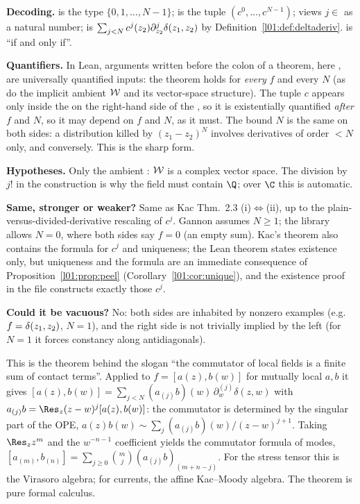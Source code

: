 \begin{dictionary}
\textbf{Decoding.}  is the type $\{0,1,\dots,N-1\}$;  is the tuple
$(c^0,\dots,c^{N-1})$;  views $j\in$  as a natural number;
 is $\sum_{j<N}c^j(z_2)\partial^j_{z_2}\delta(z_1,z_2)$ by
Definition~\ref{l01:def:deltaderiv}.  is ``if and only if''.

\textbf{Quantifiers.} In Lean, arguments written before the colon of a theorem, here
, are universally quantified inputs: the theorem holds for \emph{every} $f$ and
every $N$ (as do the implicit ambient $\mathcal{W}$ and its vector-space structure). The tuple $c$ appears only inside the
 on the right-hand side of the , so it is existentially quantified \emph{after} $f$ and $N$, so it may depend on $f$ and $N$, as it must. The bound $N$ is the same on
both sides: a distribution killed by $(z_1-z_2)^N$ involves derivatives of order $<N$ only, and
conversely. This is the sharp form.

\textbf{Hypotheses.} Only the ambient \lean{[AddCommGroup 𝒲] [Module ℂ 𝒲]}: $\mathcal{W}$ is a complex vector space.
The division by $j!$ in the construction is why the field must contain $\Q$; over $\C$ this is automatic.

\textbf{Same, stronger or weaker?} Same as Kac Thm.~2.3 (i)$\Leftrightarrow$(ii), up to the
plain-versus-divided-derivative rescaling of $c^j$. Gannon assumes $N\ge1$; the library allows $N = 0$, where
both sides say $f = 0$ (an empty sum). Kac's theorem also contains the formula for $c^j$ and uniqueness;
the Lean theorem states existence only, but uniqueness and the formula are an immediate consequence of
Proposition~\ref{l01:prop:peel} (Corollary~\ref{l01:cor:unique}), and the existence proof in the file constructs
exactly those $c^j$.

\textbf{Could it be vacuous?} No: both sides are inhabited by nonzero examples (e.g.\ $f = \delta(z_1,z_2)$, $N = 1$),
and the right side is not trivially implied by the left (for $N = 1$ it forces constancy along antidiagonals).
\end{dictionary}

\begin{physics}
This is the theorem behind the slogan ``the commutator of local fields is a finite sum of contact
terms''. Applied to $f = [a(z),b(w)]$ for mutually local $a,b$ it gives
$[a(z),b(w)] = \sum_{j<N}(a_{(j)}b)(w)\,\partial_w^{(j)}\delta(z,w)$ with $a_{(j)}b = \Res_z(z-w)^j[a(z),b(w)]$:
the commutator is determined by the singular part of the OPE, $a(z)b(w)\sim\sum_j(a_{(j)}b)(w)/(z-w)^{j+1}$.
Taking $\Res_z z^m$ and the $w^{-n-1}$ coefficient yields the commutator formula of modes,
$[a_{(m)},b_{(n)}] = \sum_{j\ge0}\binom mj(a_{(j)}b)_{(m+n-j)}$. For the stress tensor this is the
Virasoro algebra; for currents, the affine Kac--Moody algebra. The theorem is pure formal calculus.
\end{physics}

